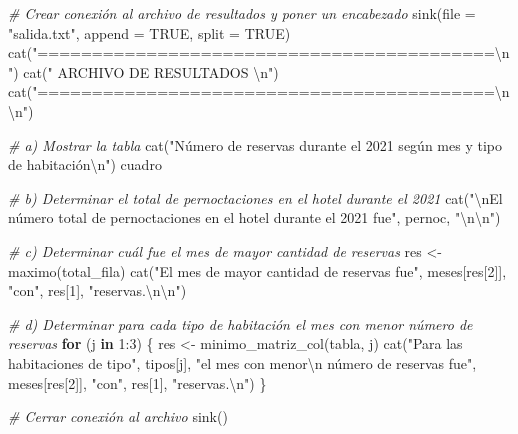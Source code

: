 \documentclass[
]{book}
\newenvironment{Shaded}{\begin{snugshade}}{\end{snugshade}}
\newcommand{\AttributeTok}[1]{\textcolor[rgb]{0.77,0.63,0.00}{#1}}
\newcommand{\CommentTok}[1]{\textcolor[rgb]{0.56,0.35,0.01}{\textit{#1}}}
\newcommand{\ConstantTok}[1]{\textcolor[rgb]{0.00,0.00,0.00}{#1}}
\newcommand{\ControlFlowTok}[1]{\textcolor[rgb]{0.13,0.29,0.53}{\textbf{#1}}}
\newcommand{\DecValTok}[1]{\textcolor[rgb]{0.00,0.00,0.81}{#1}}
\newcommand{\FunctionTok}[1]{\textcolor[rgb]{0.00,0.00,0.00}{#1}}
\newcommand{\NormalTok}[1]{#1}
\newcommand{\OtherTok}[1]{\textcolor[rgb]{0.56,0.35,0.01}{#1}}
\newcommand{\SpecialCharTok}[1]{\textcolor[rgb]{0.00,0.00,0.00}{#1}}
\newcommand{\StringTok}[1]{\textcolor[rgb]{0.31,0.60,0.02}{#1}}
\begin{document}
\begin{Shaded}
\begin{Highlighting}[]
\CommentTok{\# Crear conexión al archivo de resultados y poner un encabezado}
\FunctionTok{sink}\NormalTok{(}\AttributeTok{file =} \StringTok{"salida.txt"}\NormalTok{, }\AttributeTok{append =} \ConstantTok{TRUE}\NormalTok{, }\AttributeTok{split =} \ConstantTok{TRUE}\NormalTok{)}
\FunctionTok{cat}\NormalTok{(}\StringTok{"==========================================}\SpecialCharTok{\textbackslash{}n}\StringTok{"}\NormalTok{)}
\FunctionTok{cat}\NormalTok{(}\StringTok{"            ARCHIVO DE RESULTADOS         }\SpecialCharTok{\textbackslash{}n}\StringTok{"}\NormalTok{)}
\FunctionTok{cat}\NormalTok{(}\StringTok{"==========================================}\SpecialCharTok{\textbackslash{}n\textbackslash{}n}\StringTok{"}\NormalTok{)}

\CommentTok{\# a) Mostrar la tabla}
\FunctionTok{cat}\NormalTok{(}\StringTok{"Número de reservas durante el 2021 según mes y tipo de habitación}\SpecialCharTok{\textbackslash{}n}\StringTok{"}\NormalTok{)}
\NormalTok{cuadro}

\CommentTok{\# b) Determinar el total de pernoctaciones en el hotel durante el 2021}
\FunctionTok{cat}\NormalTok{(}\StringTok{"}\SpecialCharTok{\textbackslash{}n}\StringTok{El número total de pernoctaciones en el hotel durante el 2021 fue"}\NormalTok{, pernoc, }\StringTok{"}\SpecialCharTok{\textbackslash{}n\textbackslash{}n}\StringTok{"}\NormalTok{)}

\CommentTok{\# c) Determinar cuál fue el mes de mayor cantidad de reservas}
\NormalTok{res }\OtherTok{\textless{}{-}} \FunctionTok{maximo}\NormalTok{(total\_fila)}
\FunctionTok{cat}\NormalTok{(}\StringTok{"El mes de mayor cantidad de reservas fue"}\NormalTok{, meses[res[}\DecValTok{2}\NormalTok{]], }\StringTok{"con"}\NormalTok{, }
\NormalTok{    res[}\DecValTok{1}\NormalTok{], }\StringTok{"reservas.}\SpecialCharTok{\textbackslash{}n\textbackslash{}n}\StringTok{"}\NormalTok{)}

\CommentTok{\# d) Determinar para cada tipo de habitación el mes con menor número de reservas}
\ControlFlowTok{for}\NormalTok{ (j }\ControlFlowTok{in} \DecValTok{1}\SpecialCharTok{:}\DecValTok{3}\NormalTok{) \{}
\NormalTok{    res }\OtherTok{\textless{}{-}} \FunctionTok{minimo\_matriz\_col}\NormalTok{(tabla, j)}
    \FunctionTok{cat}\NormalTok{(}\StringTok{"Para las habitaciones de tipo"}\NormalTok{, tipos[j], }
        \StringTok{"el mes con menor}\SpecialCharTok{\textbackslash{}n}\StringTok{     número de reservas fue"}\NormalTok{, }
\NormalTok{        meses[res[}\DecValTok{2}\NormalTok{]], }\StringTok{"con"}\NormalTok{, res[}\DecValTok{1}\NormalTok{], }\StringTok{"reservas.}\SpecialCharTok{\textbackslash{}n}\StringTok{"}\NormalTok{)}
\NormalTok{\}}

\CommentTok{\# Cerrar conexión al archivo}
\FunctionTok{sink}\NormalTok{()}
\end{Highlighting}
\end{Shaded}
\end{document}
